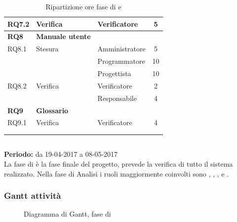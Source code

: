 \begin{longtable}{|l|l|l|c|}
	\hline
	{RQ7.2} & {Verifica} & Verificatore & 5 \\
	\hline
	\textbf{RQ8} & \textbf{Manuale utente} & &  \\
	\hline
	{RQ8.1} & {Stesura} & Amministratore  & 5\\
	& & Programmatore &  10\\
	& & Progettista &  10\\
	\hline
	{RQ8.2} & {Verifica} & Verificatore & 2 \\
	& & Responsabile & 4 \\
	\hline
	\textbf{RQ9} & \textbf{Glossario} & &  \\
	\hline
	{RQ9.1} & {Verifica} & Verificatore &  4 \\
	\hline
	\\
	\caption{Ripartizione ore fase di \PD{} e \Cod{}}
\end{longtable}
\egroup

\subsection{\VV{}}
\textbf{Periodo:} da 19-04-2017 a 08-05-2017 \\
La fase di \VV{} è la fase finale del progetto, prevede la verifica di tutto il sistema realizzato.
Nella fase di Analisi i ruoli maggiormente coinvolti sono \Programmatore{}, \Progettista{}, \Responsabile{}, \Amministratore{} e \Verificatore{}.
\subsubsection{Gantt attività}
\begin{figure}[H]
	\centering
	\caption{Diagramma di Gantt, fase di \VV{}}
\end{figure}

